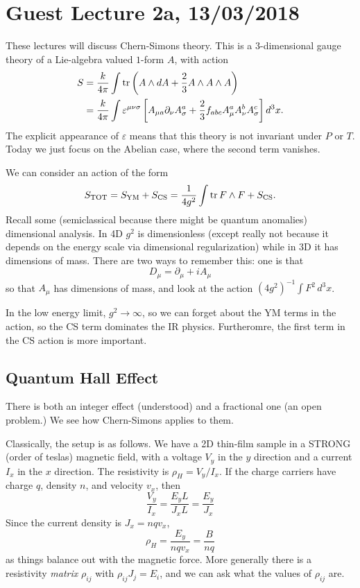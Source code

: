 \section*{Guest Lecture 2a, 13/03/2018}
These lectures will discuss Chern-Simons theory.
This is a $3$-dimensional gauge theory of a Lie-algebra valued $1$-form $A$, with action
\begin{align*}
S &= \frac{k}{4 \pi} \int \operatorname{tr} \left( A \wedge dA + \frac{2}{3} A \wedge A \wedge A\right)\\
&= \frac{k}{4 \pi} \int \varepsilon^{\mu \nu \sigma} \left[A_{\mu a} \partial_\nu A_\sigma^a + \frac{2}{3} f_{abc} A_\mu^a A_\nu^b A_\sigma^c \right] d^3x.
\end{align*}
The explicit appearance of $\varepsilon$ means that this theory is not invariant under  $P$ or $T$.
Today we just focus on the Abelian case, where the second term vanishes.

We can consider an action of the form
\[
S_{\text{TOT}} = S_{\text{YM}} + S_{\text{CS}} = \frac{1}{4g^2} \int \operatorname{tr} F \wedge F + S_{\text{CS}}.
\]
Recall some (semiclassical because there might be quantum anomalies) dimensional analysis.
In 4D $g^2$ is dimensionless (except really not because it depends on the energy scale via dimensional regularization) while in 3D it has dimensions of mass.
There are two ways to remember this: one is that
\[
D_{\mu} = \partial_\mu + i A_\mu
\]
so that $A_\mu$ has dimensions of mass, and look at the action $(4g^2)^{-1} \int F^2 \,d^3x$.

In the low energy limit, $g^2 \to \infty$, so we can forget about the YM terms in the action, so the CS term dominates the IR physics.
Furtheromre, the first term in the CS action is more important.

\subsection*{Quantum Hall Effect}
There is both an integer effect (understood) and a fractional one (an open problem.)
We see how Chern-Simons applies to them.

Classically, the setup is as follows.
We have a 2D thin-film sample in a STRONG (order of teslas) magnetic field, with a voltage $V_y$ in the $y$ direction and a current $I_x$ in the $x$ direction.
The resistivity is $\rho_H = V_y/I_x$.
If the charge carriers have charge $q$, density $n$, and velocity $v_x$, then
\[
\frac{V_y}{I_x} = \frac{E_y L}{J_x L} = \frac{E_y}{J_x}
\]
Since the current density is $J_x = nq v_x$,
\[
\rho_H = \frac{E_y}{n q v_x} = \frac{B}{nq}
\]
as things balance out with the magnetic force.
More generally there is a resistivity \emph{matrix} $\rho_{ij}$ with $\rho_{ij} J_j = E_i$, and we can ask what the values of $\rho_{ij}$ are.

